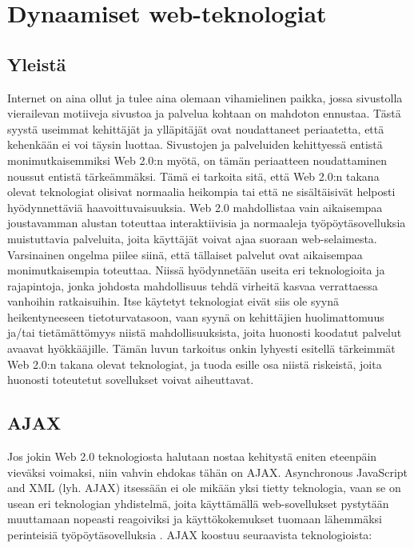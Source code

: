 
\ifdefined\seminaari
\relax
\else
\chapter{Dynaamiset web-teknologiat}
\fi

\section{Yleistä}

Internet on aina ollut ja tulee aina olemaan vihamielinen paikka, jossa sivustolla vierailevan motiiveja sivustoa ja palvelua kohtaan on mahdoton ennustaa. Tästä syystä 
useimmat kehittäjät ja ylläpitäjät ovat noudattaneet periaatetta, että kehenkään ei voi täysin luottaa. Sivustojen ja palveluiden kehittyessä entistä monimutkaisemmiksi
Web 2.0:n myötä, on tämän periaatteen noudattaminen noussut entistä tärkeämmäksi. Tämä ei tarkoita sitä, että Web 2.0:n takana olevat teknologiat olisivat normaalia 
heikompia tai että ne sisältäisivät helposti hyödynnettäviä haavoittuvaisuuksia. Web 2.0 mahdollistaa vain aikaisempaa joustavamman alustan toteuttaa interaktiivisia ja
normaaleja työpöytäsovelluksia muistuttavia palveluita, joita käyttäjät voivat ajaa suoraan web-selaimesta. Varsinainen ongelma piilee siinä, että tällaiset palvelut ovat 
aikaisempaa monimutkaisempia toteuttaa. Niissä hyödynnetään useita eri teknologioita ja rajapintoja, jonka johdosta mahdollisuus tehdä virheitä kasvaa verrattaessa
vanhoihin ratkaisuihin. Itse käytetyt teknologiat eivät siis ole syynä heikentyneeseen tietoturvatasoon, vaan syynä on kehittäjien huolimattomuus ja/tai tietämättömyys 
niistä mahdollisuuksista, joita huonosti koodatut palvelut avaavat hyökkääjille. Tämän luvun tarkoitus onkin lyhyesti esitellä tärkeimmät Web 2.0:n takana olevat teknologiat, 
ja tuoda esille osa niistä riskeistä, joita huonosti toteutetut sovellukset voivat aiheuttavat. 

\section {AJAX}

Jos jokin Web 2.0 teknologiosta halutaan nostaa kehitystä eniten eteenpäin vieväksi voimaksi, niin vahvin ehdokas tähän on AJAX.  Asynchronous JavaScript and XML (lyh. AJAX)
itsessään ei ole mikään yksi tietty teknologia, vaan se on usean eri teknologian yhdistelmä, joita käyttämällä web-sovellukset pystytään muuttamaan nopeasti reagoiviksi
ja käyttökokemukset tuomaan lähemmäksi perinteisiä työpöytäsovelluksia \cite{AJAX}. AJAX koostuu seuraavista teknologioista:


